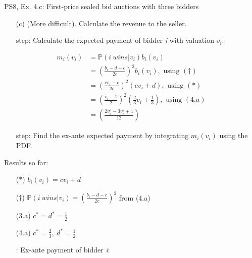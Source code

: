 \begin{frame}{PS8, Ex. 4.c: First-price sealed bid auctions with three bidders}
    \begin{itemize}
      \item[(c)] (More difficult). Calculate the revenue to the seller.
    \end{itemize}
    \vspace{-8pt}
    \begin{multicols}{2}
      \begin{itemize}
        \item[\nth{1} step:] Calculate the expected payment of bidder \textit{i} with valuation $v_i$:
      \end{itemize}
      \vspace{-10pt}
      \begin{align*}
        m_i(v_i)&=\mathbb{P}(i\ wins|v_i)b_i(v_i)\\
                &=\left(\frac{b_i-d-c}{2c}\right)^2b_i(v_i),\text{ using }(\dagger)\\
                &=\left(\frac{cv_i-c}{2c}\right)^2(cv_i+d),\text{ using }(*)\\
                &=\left(\frac{v_i-1}{2}\right)^2\left(\frac{2}{3}v_i+\frac{1}{3}\right),\text{ using }(4.a)\\
                &=\left(\frac{2v_i^3-3v_i^2+1}{12}\right)
      \end{align*}
      \vspace{-10pt}
      \begin{itemize}
        \item[\nth{2} step:] Find the ex-ante expected payment by integrating $m_i(v_i)$ using the PDF.
      \end{itemize}
      \vspace{-4pt}
      \vfill\null\columnbreak
      Results so far:
      \vspace{-6pt}
      \begin{itemize}
        \item[($*$)] $b_i(v_i) = cv_i+d$
        \item[($\dagger$)] $\mathbb{P}(i\ wins|v_i)=\left(\frac{b_i-d-c}{2c}\right)^2$ from (4.a)
        \item[(3.a)] $c^*=d^*=\frac{1}{2}$
        \item[(4.a)] $c^*=\frac{2}{3},\ d^*=\frac{1}{2}$
        \item[\nth{2}:] Ex-ante payment of bidder \textit{i}:

\end{itemize}
\end{multicols}
\end{frame}
